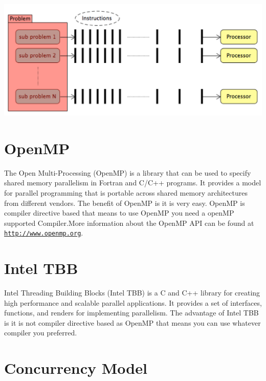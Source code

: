 \begin{DoxyImageNoCaption}
  \mbox{\includegraphics[width=\textwidth,height=\textheight/2,keepaspectratio=true]{ResearchParallelComputingDiagram.png}}
\end{DoxyImageNoCaption}
\hypertarget{_parallel_programming_model_ParallelProgrammingModelOpenMP}{}\section{Open\+M\+P}\label{_parallel_programming_model_ParallelProgrammingModelOpenMP}
The Open Multi-\/\+Processing (Open\+M\+P) is a library that can be used to specify shared memory parallelism in Fortran and C/\+C++ programs. It provides a model for parallel programming that is portable across shared memory architectures from different vendors. The benefit of Open\+M\+P is it is very easy. Open\+M\+P is compiler directive based that means to use Open\+M\+P you need a open\+M\+P supported Compiler.\+More information about the Open\+M\+P A\+P\+I can be found at \href{http://www.openmp.org}{\tt http\+://www.\+openmp.\+org}.\hypertarget{_parallel_programming_model_ParallelProgrammingModelIntelTBB}{}\section{Intel T\+B\+B}\label{_parallel_programming_model_ParallelProgrammingModelIntelTBB}
Intel Threading Building Blocks (Intel T\+B\+B) is a C and C++ library for creating high performance and scalable parallel applications. It provides a set of interfaces, functions, and renders for implementing parallelism. The advantage of Intel T\+B\+B is it is not compiler directive based as Open\+M\+P that means you can use whatever compiler you preferred.\hypertarget{_parallel_programming_model_ParallelProgrammingModelConcurrencyModel}{}\section{Concurrency Model}\label{_parallel_programming_model_ParallelProgrammingModelConcurrencyModel}
